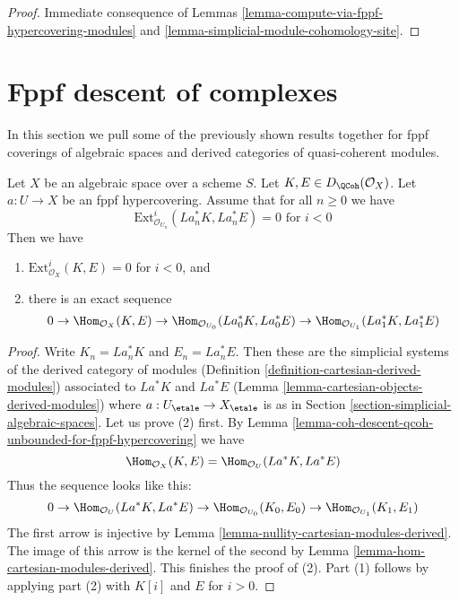 \begin{proof}
Immediate consequence of
Lemmas \ref{lemma-compute-via-fppf-hypercovering-modules}
and \ref{lemma-simplicial-module-cohomology-site}.
\end{proof}







\section{Fppf descent of complexes}
\label{section-fppf-descent-derived}

\noindent
In this section we pull some of the previously shown
results together for fppf coverings of algebraic spaces
and derived categories of quasi-coherent modules.

\begin{lemma}
\label{lemma-fppf-neg-ext-zero-hom}
Let $X$ be an algebraic space over a scheme $S$.
Let $K, E \in D_\QCoh(\mathcal{O}_X)$.
Let $a : U \to X$ be an fppf hypercovering.
Assume that for all $n \geq 0$ we have
$$
\text{Ext}_{\mathcal{O}_{U_n}}^i(La_n^*K, La_n^*E) = 0
\text{ for } i < 0
$$
Then we have
\begin{enumerate}
\item $\text{Ext}_{\mathcal{O}_X}^i(K, E) = 0$ for $i < 0$, and
\item there is an exact sequence
$$
0
\to
\Hom_{\mathcal{O}_X}(K, E)
\to
\Hom_{\mathcal{O}_{U_0}}(La_0^*K, La_0^*E)
\to
\Hom_{\mathcal{O}_{U_1}}(La_1^*K, La_1^*E)
$$
\end{enumerate}
\end{lemma}

\begin{proof}
Write $K_n = La_n^*K$ and $E_n = La_n^*E$. Then these are the
simplicial systems of the derived category of modules
(Definition \ref{definition-cartesian-derived-modules})
associated to $La^*K$ and $La^*E$
(Lemma \ref{lemma-cartesian-objects-derived-modules})
where $a : U_\etale \to X_\etale$ is as in
Section \ref{section-simplicial-algebraic-spaces}.
Let us prove (2) first. By
Lemma \ref{lemma-coh-descent-qcoh-unbounded-for-fppf-hypercovering}
we have
$$
\Hom_{\mathcal{O}_X}(K, E) =
\Hom_{\mathcal{O}_U}(La^*K, La^*E)
$$
Thus the sequence looks like this:
$$
0
\to
\Hom_{\mathcal{O}_U}(La^*K, La^*E)
\to
\Hom_{\mathcal{O}_{U_0}}(K_0, E_0)
\to
\Hom_{\mathcal{O}_{U_1}}(K_1, E_1)
$$
The first arrow  is injective by
Lemma \ref{lemma-nullity-cartesian-modules-derived}.
The image of this arrow is the kernel of the second
by Lemma \ref{lemma-hom-cartesian-modules-derived}.
This finishes the proof of (2).
Part (1) follows by applying part (2) with
$K[i]$ and $E$ for $i > 0$.
\end{proof}

